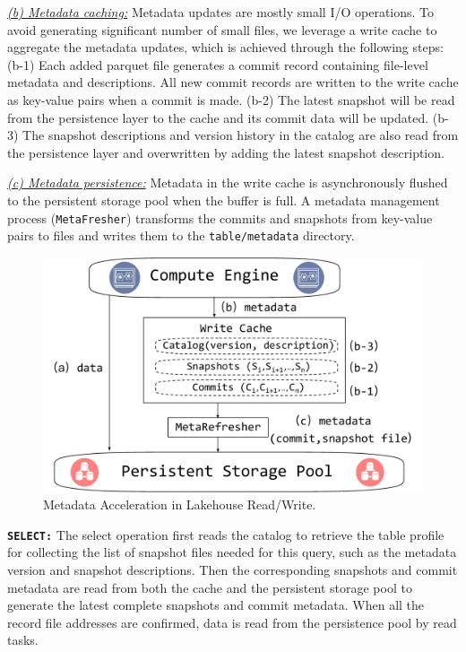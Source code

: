 
\noindent \underline{\textit{(b) Metadata caching:}} Metadata updates are mostly small I/O operations. 
To avoid generating significant number of small files, we leverage a  write cache to aggregate the metadata updates, which is achieved through the following steps:
(b-1) Each added parquet file generates a commit record containing file-level metadata and descriptions. All new commit records are written to the write cache as key-value pairs when a commit is made.
(b-2) The latest snapshot will be read from the persistence layer to the cache and its commit data will be updated.
(b-3) The snapshot descriptions and version history in the catalog are also read from the persistence layer and  overwritten by adding the latest snapshot description. 

\noindent \underline{\textit{(c) Metadata persistence:}} Metadata in the  write cache is asynchronously flushed to the persistent storage pool when the buffer is full. A metadata management process (\texttt{MetaFresher}) transforms the commits and snapshots from key-value pairs to files and writes them to the \texttt{table/metadata} directory.

\begin{figure}[htbp]
	\includegraphics[scale=0.3]{figures/cache}
	\centering
	\vspace{-1em}
	\caption{Metadata Acceleration in Lakehouse Read/Write.}
	\label{fig:cache}
	\vspace{-1em}
\end{figure}


\noindent \textbf{\texttt{SELECT:}} The select operation first reads the catalog to retrieve the table profile for collecting the list of snapshot files needed for this query, such as the metadata version and snapshot descriptions. Then the corresponding snapshots and commit metadata are read from both the  cache and the persistent storage pool to generate the latest complete snapshots and commit metadata. When all the record file addresses are confirmed, data is read from the persistence pool by read tasks.

